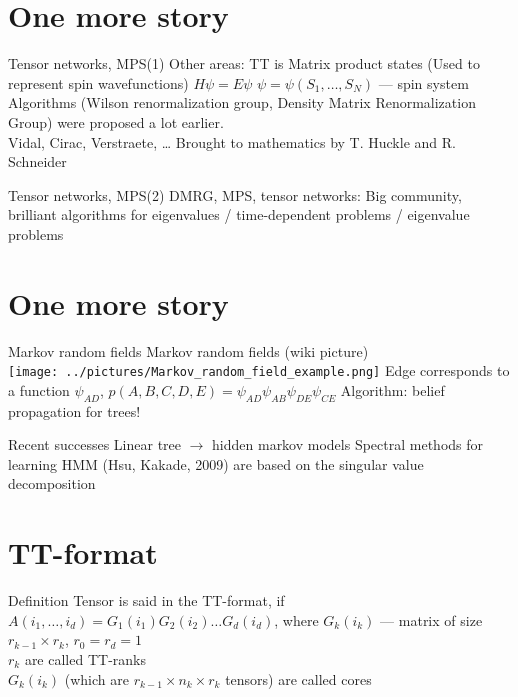 \documentclass{beamer}[14pt, presentation]
\begin{document}
\section{One more story}
\label{sec-3}
\begin{frame}[label=sec-3-1]{Tensor networks, MPS(1)}
Other areas: \vskip 2mm
TT is Matrix product states 
\vskip 2mm (Used to represent spin wavefunctions)
\vskip 2mm
$H \psi = E \psi$ \vskip 2mm
$\psi = \psi(S_1, \ldots, S_N)$ --- spin system \vskip 2mm
Algorithms  (Wilson renormalization group, Density Matrix
Renormalization Group) were proposed a lot earlier.  \\
Vidal, Cirac, Verstraete, \ldots
\vskip 2mm
Brought to mathematics by T. Huckle and R. Schneider
\end{frame}

\begin{frame}[label=sec-3-2]{Tensor networks, MPS(2)}
DMRG, MPS,  tensor networks: \vskip 2mm
Big community, brilliant algorithms for eigenvalues / time-dependent
problems / eigenvalue problems
\end{frame}

\section{One more story}
\label{sec-4}
\begin{frame}[label=sec-4-1]{Markov random fields}
Markov random fields (wiki picture) \\
\texttt{[image: ../pictures/Markov\_random\_field\_example.png]}
Edge corresponds to a function $\psi_{AD}$, 
\vskip 2mm
$p(A, B, C, D, E) = \psi_{AD} \psi_{AB} \psi_{DE} \psi_{CE}$ \vskip 2mm
Algorithm: \alert{belief propagation for trees!}
\end{frame}

\begin{frame}[label=sec-4-2]{Recent successes}
Linear tree $\rightarrow$ \alert{hidden markov models}
\vskip 2mm
Spectral methods for learning HMM (Hsu, Kakade, 2009) are based on the
singular value decomposition
\end{frame}

\section{TT-format}
\label{sec-5}
\begin{frame}[label=sec-5-1]{Definition}
Tensor is said  in the TT-format, if 
\vskip 2mm
$A(i_1,\ldots,i_d) = G_1(i_1)G_2(i_2) \ldots G_d(i_d)$,
\vskip 2mm
where $G_k(i_k)$ --- matrix of size $r_{k-1} \times r_k$, $r_0 = r_d = 1$
\\
$r_k$ are called \alert{TT-ranks} \\
$G_k(i_k)$ (which are $r_{k-1} \times n_k \times r_k$ tensors)
are called  \alert{cores}
\end{frame}
\end{document}
